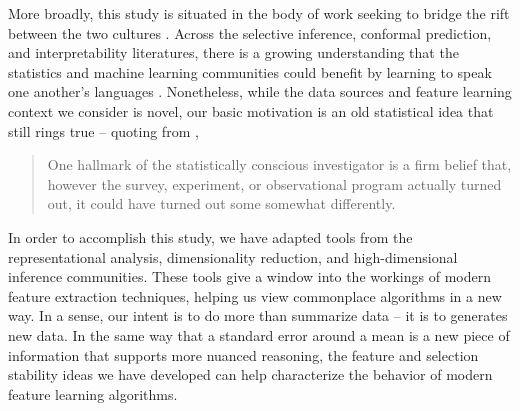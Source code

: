 More broadly, this study is situated in the body of work seeking to bridge the
rift between the two cultures \citep{breiman2001statistical,
  efron2020prediction}. Across the selective inference, conformal prediction,
and interpretability literatures, there is a growing understanding that the
statistics and machine learning communities could benefit by learning to speak
one another's languages \citep{angelopoulos2020uncertainty, ren2020knockoffs}.
Nonetheless, while the data sources and feature learning context we consider is
novel, our basic motivation is an old statistical idea that still rings true --
quoting from \citep{mosteller1977data},

\begin{quote}
One hallmark of the statistically conscious investigator is a firm belief that,
however the survey, experiment, or observational program actually turned out, it
could have turned out some somewhat differently.
\end{quote}

In order to accomplish this study, we have adapted tools from the
representational analysis, dimensionality reduction, and high-dimensional
inference communities. These tools give a window into the workings of modern
feature extraction techniques, helping us view commonplace algorithms in a new
way. In a sense, our intent is to do more than summarize data -- it is to
generates new data. In the same way that a standard error around a mean is a new
piece of information that supports more nuanced reasoning, the feature and
selection stability ideas we have developed can help characterize the behavior
of modern feature learning algorithms.
